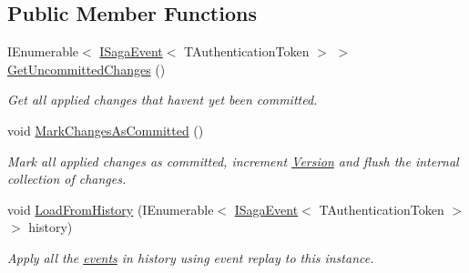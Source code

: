 \subsection*{Public Member Functions}
\begin{DoxyCompactItemize}
\item 
I\+Enumerable$<$ \hyperlink{interfaceCqrs_1_1Events_1_1ISagaEvent}{I\+Saga\+Event}$<$ T\+Authentication\+Token $>$ $>$ \hyperlink{interfaceCqrs_1_1Domain_1_1ISaga_abb77811b4f7d19adb61f9d33da18e7e0_abb77811b4f7d19adb61f9d33da18e7e0}{Get\+Uncommitted\+Changes} ()
\begin{DoxyCompactList}\small\item\em Get all applied changes that haven\textquotesingle{}t yet been committed. \end{DoxyCompactList}\item 
void \hyperlink{interfaceCqrs_1_1Domain_1_1ISaga_a85c75f80bc5be4bad7f1d9f1231bfba7_a85c75f80bc5be4bad7f1d9f1231bfba7}{Mark\+Changes\+As\+Committed} ()
\begin{DoxyCompactList}\small\item\em Mark all applied changes as committed, increment \hyperlink{interfaceCqrs_1_1Domain_1_1ISaga_a83a02ff45543d670356dde4149cdc614_a83a02ff45543d670356dde4149cdc614}{Version} and flush the internal collection of changes. \end{DoxyCompactList}\item 
void \hyperlink{interfaceCqrs_1_1Domain_1_1ISaga_a2714804684bc65cf4dec79b4697b9b21_a2714804684bc65cf4dec79b4697b9b21}{Load\+From\+History} (I\+Enumerable$<$ \hyperlink{interfaceCqrs_1_1Events_1_1ISagaEvent}{I\+Saga\+Event}$<$ T\+Authentication\+Token $>$$>$ history)
\begin{DoxyCompactList}\small\item\em Apply all the \hyperlink{}{events} in {\itshape history}  using event replay to this instance. \end{DoxyCompactList}\end{DoxyCompactItemize}
